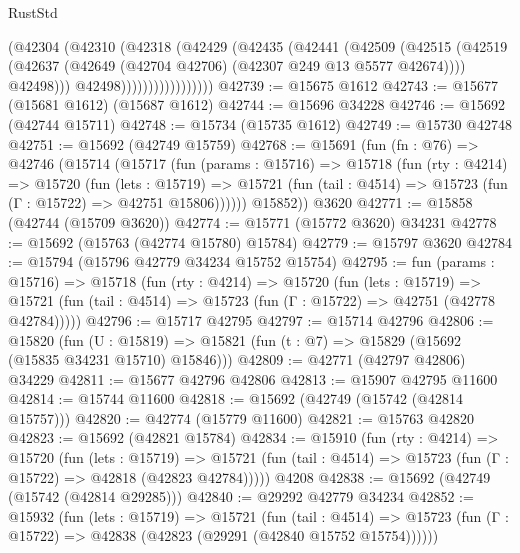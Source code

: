 \begin{lexlean}{RustStd}
\begin{coremodule}
                            (@42304
                              (@42310
                                (@42318
                                  (@42429
                                    (@42435
                                      (@42441
                                        (@42509
                                          (@42515
                                            (@42519
                                              (@42637
                                                (@42649
                                                  (@42704 @42706)
                                                  (@42307 @249 @13 @5577 @42674))))
                                            @42498)))
                                      @42498)))))))))))))))))
@42739 := @15675 @1612
@42743 := @15677 (@15681 @1612) (@15687 @1612)
@42744 := @15696 @34228
@42746 := @15692 (@42744 @15711)
@42748 := @15734 (@15735 @1612)
@42749 := @15730 @42748
@42751 := @15692 (@42749 @15759)
@42768 := @15691
    (fun (fn : @76) =>
    @42746
      (@15714
        (@15717
          (fun (params : @15716) =>
          @15718
            (fun (rty : @4214) =>
            @15720
              (fun (lets : @15719) =>
              @15721 (fun (tail : @4514) => @15723 (fun (Γ : @15722) => @42751 @15806))))))
        @15852))
    @3620
@42771 := @15858 (@42744 (@15709 @3620))
@42774 := @15771 (@15772 @3620) @34231
@42778 := @15692 (@15763 (@42774 @15780) @15784)
@42779 := @15797 @3620
@42784 := @15794 (@15796 @42779 @34234 @15752 @15754)
@42795 := fun (params : @15716) =>
  @15718
    (fun (rty : @4214) =>
    @15720
      (fun (lets : @15719) =>
      @15721 (fun (tail : @4514) => @15723 (fun (Γ : @15722) => @42751 (@42778 @42784)))))
@42796 := @15717 @42795
@42797 := @15714 @42796
@42806 := @15820
    (fun (U : @15819) => @15821 (fun (t : @7) => @15829 (@15692 (@15835 @34231 @15710) @15846)))
@42809 := @42771 (@42797 @42806) @34229
@42811 := @15677 @42796 @42806
@42813 := @15907 @42795 @11600
@42814 := @15744 @11600
@42818 := @15692 (@42749 (@15742 (@42814 @15757)))
@42820 := @42774 (@15779 @11600)
@42821 := @15763 @42820
@42823 := @15692 (@42821 @15784)
@42834 := @15910
    (fun (rty : @4214) =>
    @15720
      (fun (lets : @15719) =>
      @15721 (fun (tail : @4514) => @15723 (fun (Γ : @15722) => @42818 (@42823 @42784)))))
    @4208
@42838 := @15692 (@42749 (@15742 (@42814 @29285)))
@42840 := @29292 @42779 @34234
@42852 := @15932
    (fun (lets : @15719) =>
    @15721
      (fun (tail : @4514) =>
      @15723 (fun (Γ : @15722) => @42838 (@42823 (@29291 (@42840 @15752 @15754))))))

\end{coremodule}
\end{lexlean}
